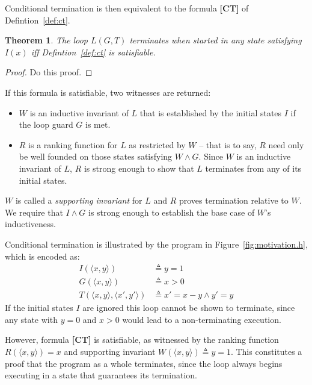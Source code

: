 \documentclass[preprint]{sigplanconf}
\newtheorem{theorem}{Theorem}
\theoremstyle{definition}
\begin{document}
Conditional termination is then equivalent to the
formula {\bf [CT]} of Defintion~\ref{def:ct}.

\begin{theorem}
\label{thm:ct}
 The loop $L(G, T)$ terminates when started in any state satisfying $I(x)$ iff
 Defintion~\ref{def:ct} is satisfiable.
\end{theorem}

\begin{proof}
 Do this proof.
\end{proof}

If this formula is satisfiable, two witnesses are returned:
\begin{itemize}
\item $W$ is an inductive invariant of $L$ that is established by the initial states $I$ if the loop
guard $G$ is met.
\item $R$ is a ranking function for $L$ as restricted by $W$ -- that is to say, $R$ need only
be well founded on those states satisfying $W \wedge G$.  Since $W$ is an inductive invariant of $L$,
$R$ is strong enough to show that $L$ terminates from any of its initial states.
\end{itemize}

$W$ is called a \emph{supporting invariant} for $L$ and $R$ proves termination relative to $W$.
We require that $I \wedge G$ is strong enough to establish the base case of $W$'s inductiveness.

Conditional termination is illustrated by the program in Figure~\ref{fig:motivation.h},
which is encoded as:
\begin{align*}
            I(\langle x, y \rangle) & \triangleq y = 1 \\
            G(\langle x, y \rangle) & \triangleq x > 0 \\
            T(\langle x, y \rangle, \langle x', y' \rangle) & \triangleq x' = x - y \wedge y' = y 
\end{align*}
If the initial states $I$ are ignored this loop cannot be shown to terminate, since any state with $y = 0$ and $x > 0$
would lead to a non-terminating execution.

However, formula {\bf [CT]} is satisfiable, as witnessed by the ranking function
$R(\langle x,y\rangle) = x$ and supporting invariant $W(\langle x, y \rangle ) \triangleq y = 1$.
This constitutes a proof that the program as a whole terminates, since the loop always begins
executing in a state that guarantees its termination.\\
\end{document}
